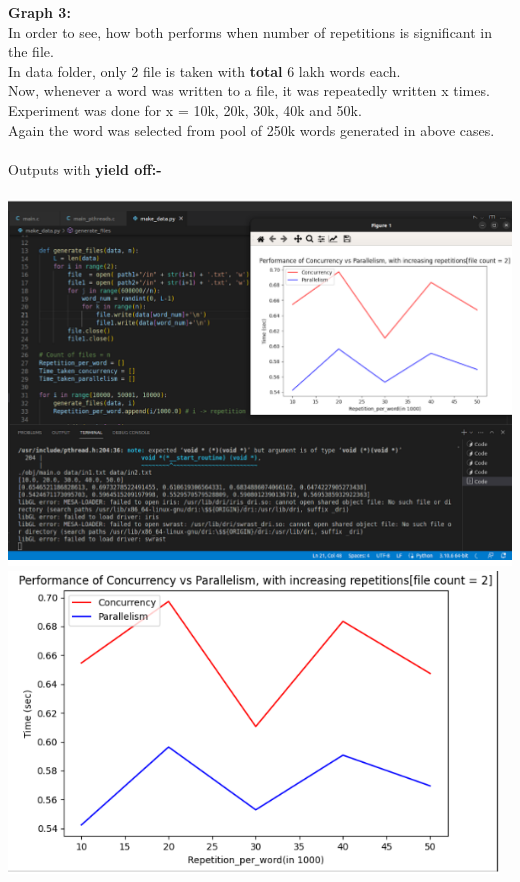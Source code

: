 \documentclass[12pt]{article}
\begin{document}
\begin{spacing}{1.2}
\textbf{Graph 3:}\\
In order to see, how both performs when number of repetitions is significant in the file.\\
In data folder, only 2 file is taken with \textbf{total} 6 lakh words each.\\
Now, whenever a word was written to a file, it was repeatedly written x times. Experiment was done for x = 10k, 20k, 30k, 40k and 50k.\\
Again the word was selected from pool of 250k words generated in above cases.\\
\\
Outputs with \textbf{yield off:-}\\
\\
\includegraphics[width=17cm]{images/39.png}\\
\includegraphics[width=13cm]{images/40.png}\\


\end{spacing}
\end{document}
